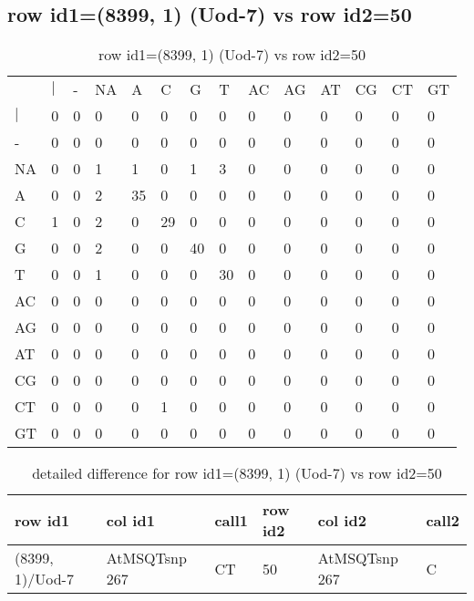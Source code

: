 \subsection{row id1=(8399, 1) (Uod-7) vs row id2=50}
\begin{center}
\begin{longtable}{|l|l|l|l|l|l|l|l|l|l|l|l|l|l|}
\caption{row id1=(8399, 1) (Uod-7) vs row id2=50} \label{table_dm458}\\
\hline
\\
\hline
&$|$&-&NA&A&C&G&T&AC&AG&AT&CG&CT&GT\\
$|$&0&0&0&0&0&0&0&0&0&0&0&0&0\\
-&0&0&0&0&0&0&0&0&0&0&0&0&0\\
NA&0&0&1&1&0&1&3&0&0&0&0&0&0\\
A&0&0&2&35&0&0&0&0&0&0&0&0&0\\
C&1&0&2&0&29&0&0&0&0&0&0&0&0\\
G&0&0&2&0&0&40&0&0&0&0&0&0&0\\
T&0&0&1&0&0&0&30&0&0&0&0&0&0\\
AC&0&0&0&0&0&0&0&0&0&0&0&0&0\\
AG&0&0&0&0&0&0&0&0&0&0&0&0&0\\
AT&0&0&0&0&0&0&0&0&0&0&0&0&0\\
CG&0&0&0&0&0&0&0&0&0&0&0&0&0\\
CT&0&0&0&0&1&0&0&0&0&0&0&0&0\\
GT&0&0&0&0&0&0&0&0&0&0&0&0&0\\
\hline
\end{longtable}
\end{center}

\begin{center}
\begin{longtable}{|l|l|l|l|l|l|}
\caption{detailed difference for row id1=(8399, 1) (Uod-7) vs row id2=50} \label{table_dm459}\\
\hline
row id1&col id1&call1&row id2&col id2&call2\\
\hline
(8399, 1)/Uod-7&AtMSQTsnp 267&CT&50&AtMSQTsnp 267&C\\
\hline
\end{longtable}
\end{center}

